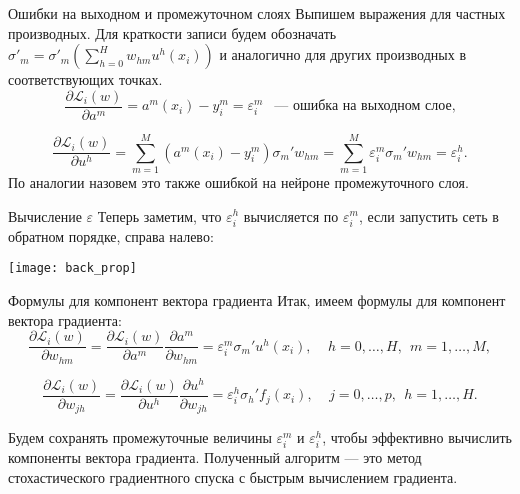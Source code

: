 \documentclass[11pt]{beamer}
\begin{document}
	\begin{frame}{Ошибки на выходном и промежуточном слоях}
		Выпишем выражения для частных производных. Для краткости записи будем обозначать $\sigma'_m = \sigma'_m (\sum\limits_{h=0}^H w_{hm} u^h(x_i))$ и аналогично для других производных в соответствующих точках.
		\begin{equation*}
			\frac{\partial \mathcal{L}_i(w)}{\partial a^m} = a^m(x_i) - y_i^m = \varepsilon^m_i ~~\text{ --- ошибка на выходном слое,}
		\end{equation*}
		
		\begin{equation*}
			\frac{\partial \mathcal{L}_i(w)}{\partial u^h} = \sum \limits_{m=1}^M (a^m(x_i) - y_i^m) \sigma_m' w_{hm} = \sum \limits_{m=1}^M \varepsilon^m_i \sigma_m' w_{hm} = \varepsilon^h_i.
		\end{equation*}
		По аналогии назовем это также ошибкой на нейроне промежуточного слоя.
	\end{frame}

	\begin{frame}{Вычисление $\varepsilon$}
		Теперь заметим, что $\varepsilon_i^h$ вычисляется по $\varepsilon_i^m$, если запустить сеть в обратном порядке, справа налево:
		
		\begin{center}
			\centering
			\texttt{[image: back\_prop]}
		\end{center}
	\end{frame}

	\begin{frame}{Формулы для компонент вектора градиента}
		Итак, имеем формулы для компонент вектора градиента:
		\begin{equation*}
			\frac{\partial \mathcal{L}_i(w)}{\partial w_{hm}} = \frac{\partial \mathcal{L}_i(w)}{\partial a^m} \frac{\partial a^m}{\partial w_{hm}} =   \varepsilon^m_i \sigma_m' u^h(x_i), ~~~~~ h=0,\ldots,H, ~~ m=1,\ldots,M,
		\end{equation*}
		
		\begin{equation*}
			\frac{\partial \mathcal{L}_i(w)}{\partial w_{jh}} = \frac{\partial \mathcal{L}_i(w)}{\partial u^h} \frac{\partial u^h}{\partial w_{jh}} =   \varepsilon^h_i \sigma_h' f_j(x_i), ~~~~~ j=0,\ldots,p, ~~ h=1,\ldots,H.
		\end{equation*}
		
		Будем сохранять промежуточные величины $\varepsilon_i^m$ и $\varepsilon_i^h$, чтобы эффективно вычислить компоненты вектора градиента. Полученный алгоритм --- это метод стохастического градиентного спуска с быстрым вычислением градиента. \\
	\end{frame}
\end{document}
